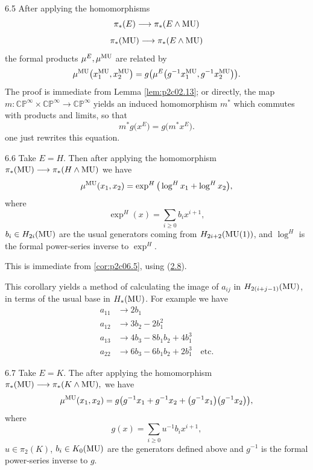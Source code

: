 \documentclass[../main]{subfiles}
\begin{document}
\begin{customcor}{6.5}
\label{cor:p2c06.5}
After applying the homomorphisms
\[\pi_\ast(E)\longrightarrow \pi_\ast(E\wedge \mathrm{MU})\]
\[\pi_\ast(\mathrm{MU})\longrightarrow \pi_\ast(E\wedge \mathrm{MU})\]
the formal products $\mu^E,\mu^{\mathrm{MU}}$ are related by 
\[\mu^{\mathrm{MU}}\big(x_1^{\mathrm{MU}},x_2^{\mathrm{MU}}\big)=g\big(\mu^E\big(g^{-1}x_1^{\mathrm{MU}},g^{-1}x_2^{\mathrm{MU}}\big)\big).\]
The proof is immediate from Lemma \ref{lem:p2c02.13}; or directly, the map \newline $m:\mathbb{CP}^\infty\times\mathbb{CP}^\infty\longrightarrow \mathbb{CP}^\infty$ yields an induced homomorphism $m^\ast$ which commutes with products and limits, so that 
\[m^\ast g\big(x^E\big)=g\big(m^\ast x^E\big).\]
one just rewrites this equation.
\end{customcor}
\begin{customcor}{6.6}
\label{cor:p2c06.6}
Take $E=H.$ Then after applying the homomorphism $\pi_\ast(\mathrm{MU})\longrightarrow \pi_\ast(H\wedge \mathrm{MU})$ we have 
\[\mu^{\mathrm{MU}}(x_1,x_2)=\exp^H\big(\log^Hx_1+\log^Hx_2\big),\]
where 
\[\exp^H(x)=\sum_{i\geq 0}b_ix^{i+1},\]
$b_i\in H_{2i}(\mathrm{MU})$ are the usual generators coming from $H_{2i+2}(\mathrm{MU}(1))$, and $\log^H$ is the formal power-series inverse to $\exp^H$.
\end{customcor}
This is immediate from \eqref{cor:p2c06.5}, using (\hyperref[ex:p2c02.8]{2.8}).

This corollary yields a method of calculating the image of $a_{ij}$ in $H_{2(i+j-1)}(\mathrm{MU})$, in terms of the usual base in $H_\ast(\mathrm{MU})$. For example we have 
\begin{align*}
    a_{11} &\longrightarrow 2b_1  \\
    a_{12} &\longrightarrow 3b_2-2b_1^2  \\ 
    a_{13} &\longrightarrow 4b_3-8b_1b_2+4b_1^3  \\
    a_{22} &\longrightarrow 6b_3-6b_1b_2+2b_1^3 \quad \text{etc.} 
\end{align*}
\begin{customcor}{6.7}
\label{cor:p2c06.7}
Take $E=K$. The after applying the homomorphism $\pi_\ast(\mathrm{MU})\longrightarrow \pi_\ast(K\wedge \mathrm{MU}),$ we have
\[\mu^{\mathrm{MU}}(x_1,x_2)=g\big(g^{-1}x_1+g^{-1}x_2+\big(g^{-1}x_1\big)\big(g^{-1}x_2\big)\big),\]
where 
\[g(x)=\sum_{i\geq 0} u^{-1}b_ix^{i+1},\]
$u\in \pi_2(K)$, $b_i\in K_0(\mathrm{MU})$ are the generators defined above and $g^{-1}$ is the formal power-series inverse to $g$.
\end{customcor}
\end{document}
